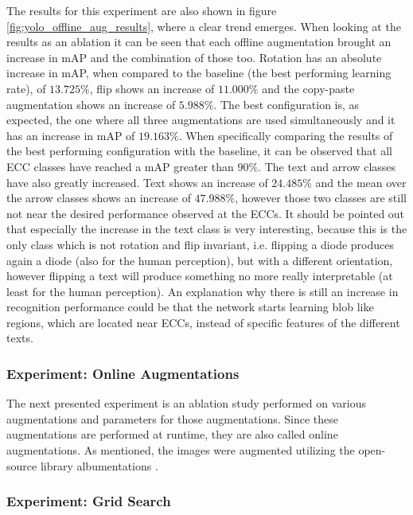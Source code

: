 The results for this experiment are also shown in figure \ref{fig:yolo_offline_aug_results}, where a clear trend emerges.
When looking at the results as an ablation it can be seen that each offline augmentation brought an increase in \ac{mAP} and the combination of those too.
Rotation has an absolute increase in mAP, when compared to the baseline (the best performing learning rate), of $13.725\%$, flip shows an increase of $11.000\%$ and the copy-paste augmentation shows an increase of $5.988\%$.
The best configuration is, as expected, the one where all three augmentations are used simultaneously and it has an increase in \ac{mAP} of $19.163\%$.
When specifically comparing the results of the best performing configuration with the baseline, it can be observed that all \ac{ECC} classes have reached a \ac{mAP} greater than $90\%$.
The text and arrow classes have also greatly increased.
Text shows an increase of $24.485\%$ and the mean over the arrow classes shows an increase of $47.988\%$, however those two classes are still not near the desired performance observed at the \acp{ECC}.
It should be pointed out that especially the increase in the text class is very interesting, because this is the only class which is not rotation and flip invariant, i.e. flipping a diode produces again a diode (also for the human perception), but with a different orientation, however flipping a text will produce something no more really interpretable (at least for the human perception).
An explanation why there is still an increase in recognition performance could be that the network starts learning blob like regions, which are located near \acp{ECC}, instead of specific features of the different texts.


\subsubsection{Experiment: Online Augmentations}

The next presented experiment is an ablation study performed on various augmentations and parameters for those augmentations.
Since these augmentations are performed at runtime, they are also called online augmentations.
As mentioned, the images were augmented utilizing the open-source library albumentations \cite{albumentation}.


\subsubsection{Experiment: Grid Search}

